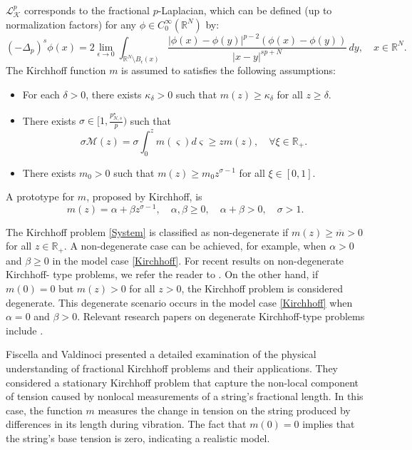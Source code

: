 \documentclass[reqno]{amsart}
\begin{document}
$\mathcal{L}_\mathcal{K}^p$ corresponds to the fractional $p$-Laplacian, which can be 
defined (up to normalization factors) for any $\phi\in C^\infty_0(\mathbb{R}^N)$ by:
$$
(-\Delta_p)^s\phi(x)
=2\lim_{\epsilon\to 0}\int_{\mathbb{R}^N\setminus B_\epsilon(x)}
\frac{|\phi(x)-\phi(y)|^{p-2}(\phi(x)-\phi(y))}{|x-y|^{sp+N}}\,dy,\quad x\in\mathbb{R}^N.
$$
The Kirchhoff function $m$ is assumed to satisfies the following assumptions:
\begin{itemize}
 \item[(A1)] For each $\delta>0$, there exists $\kappa_\delta>0$ such that
 $m(z)\geq \kappa_\delta$ for all $z\geq \delta$.

\item[(A2)] There exists $\sigma\in [1,\frac{p^\star_{N,s}}{p})$ such that
 $$ 
\sigma\mathscr{M}(z)=\sigma\int_0^z m(\varsigma)d\varsigma
\geq z m(z),\quad \forall \xi\in \mathbb{R}_+.
$$

\item[(A3)] There exists $m_0>0$ such that
$m(z)\geq m_0z^{\sigma-1}$ for all $\xi\in [0,1]$.
\end{itemize} 
A prototype for $m$, proposed by Kirchhoff, is 
\begin{equation}\label{Kirchhoff}
m(z)=\alpha+\beta z^{\sigma-1},\quad \alpha,\beta \geq 0,\quad \alpha+\beta>0,
\quad \sigma>1.
\end{equation}

The Kirchhoff problem \eqref{System} is classified as non-degenerate if 
$m(z)\geq \overline{m}>0$ for all $z\in \mathbb{R}_+$.
A non-degenerate case can be achieved, for example, when $\alpha>0$ and $\beta\geq 0$
in the model case \eqref{Kirchhoff}. For recent results on non-degenerate Kirchhoff-
type problems, we refer the reader to \cite{o, Ny, Ny1, Ny2, p}. On the other hand, 
if $m(0)=0$ but $m(z)>0$ for all $z>0$, the Kirchhoff problem is considered degenerate. 
This degenerate scenario occurs in the model case  \eqref{Kirchhoff} when 
$\alpha=0$ and $\beta>0$. Relevant research papers on degenerate Kirchhoff-type problems
include \cite{Au, Col, daoua, Liu, s}.

Fiscella and Valdinoci  \cite{fisc} presented a detailed examination of the physical 
understanding of fractional Kirchhoff problems and their applications.  
They considered a stationary Kirchhoff  problem that capture the non-local component 
of tension caused by nonlocal measurements of a string's fractional length.  
In this case, the function $m$ measures the change in tension on the string produced 
by differences in its length during vibration.  
The fact that $m(0)=0$ implies that the string's base tension is zero, indicating 
a realistic model.
\end{document}
